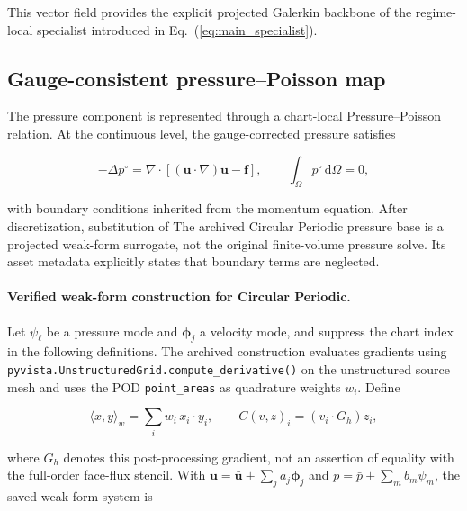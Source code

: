 \documentclass{article}
\def\plaineqref#1{\ref{#1}}
\providecommand{\DIFaddtex}[1]{{\protect\color{blue} \sf #1}} %
\providecommand{\DIFdeltex}[1]{{\protect\color{red} \scriptsize #1}} %
\providecommand{\DIFaddbegin}{} %
\providecommand{\DIFdelbegin}{} %
\providecommand{\DIFdelend}{} %
\providecommand{\DIFadd}[1]{\texorpdfstring{\DIFaddtex{#1}}{#1}} %
\providecommand{\DIFdel}[1]{\texorpdfstring{\DIFdeltex{#1}}{}} %
\begin{document}
This vector field provides the explicit projected Galerkin backbone of the
regime-local specialist introduced in
Eq.~(\plaineqref{eq:main_specialist}).


\subsection{Gauge-consistent pressure--Poisson map}

The pressure component is represented through a chart-local
Pressure--Poisson relation.
At the continuous level, the gauge-corrected pressure satisfies


\begin{equation}
    -\Delta p^\circ
    =
    \nabla\!\cdot
    \left[
        (\bm u\!\cdot\!\nabla)\bm u
        -
        \bm f
    \right],
    \qquad
    \int_\Omega p^\circ\,\mathrm d\Omega=0,
    \label{eq:app_continuous_pressure_poisson}
\end{equation}


with boundary conditions inherited from the momentum equation. \DIFdelbegin \DIFdel{After discretization, substitution of }\DIFdelend \DIFaddbegin \DIFadd{The archived Circular Periodic pressure base is a projected weak-form surrogate, not the original finite-volume pressure solve. Its asset metadata explicitly states that boundary terms are neglected.
}

\paragraph{\DIFadd{Verified weak-form construction for Circular Periodic.}}
\DIFadd{Let $\psi_\ell$ be a pressure mode and $\bm\phi_j$ a velocity mode, and suppress the chart index in the following definitions. The archived construction evaluates gradients using \texttt{pyvista.UnstructuredGrid.compute\_derivative()} on the unstructured source mesh and uses the POD \texttt{point\_areas} as quadrature weights $w_i$. Define
}



{\color{blue}
\begin{equation}
 \langle x,y\rangle_w=\sum_i w_i\,x_i\cdot y_i,
 \qquad
 C(v,z)_i=(v_i\cdot G_h)z_i ,
\end{equation}
}



\DIFadd{where $G_h$ denotes this post-processing gradient, not an assertion of equality with the full-order face-flux stencil. With $\bm u=\bar{\bm u}+\sum_j a_j\bm\phi_j$ and $p=\bar p+\sum_m b_m\psi_m$, the saved weak-form system is
}
\end{document}
